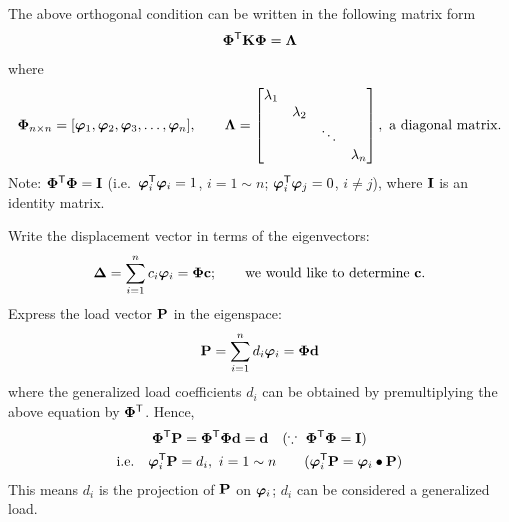 The above orthogonal condition can be written in the following matrix form
\begin{equation}
  \bm{\Phi}^{\mathsf{T}}\mathbf{K}\bm{\Phi} = \bm{\Lambda}
\end{equation}
where
\begin{equation}
  \bm{\Phi}_{n\times n} = [\bm{\varphi}_1,\bm{\varphi}_2,\bm{\varphi}_3,\dots,\bm{\varphi}_n],\qquad
  \bm{\Lambda} = \begin{bmatrix}\lambda_1 & & & \\ & \lambda_2 & & \\ & & \ddots & \\ & & & \lambda_n\end{bmatrix},\ \text{a diagonal matrix}.
\end{equation}
Note: $\bm{\Phi}^{\mathsf{T}}\bm{\Phi} = \mathbf{I}$ (i.e.\ $\bm{\varphi}_i^{\mathsf{T}}\bm{\varphi}_i = 1$, $i = 1\sim n$; $\bm{\varphi}_i^{\mathsf{T}}\bm{\varphi}_j = 0$, $i\neq j$), where $\mathbf{I}$ is an identity matrix.

Write the displacement vector in terms of the eigenvectors:
\begin{equation}
  \bm{\Delta} = \sum_{i=1}^{n}c_i\bm{\varphi}_i = \bm{\Phi}\mathbf{c};\qquad\text{we would like to determine }\mathbf{c}.
\end{equation}
Express the load vector $\mathbf{P}$ in the eigenspace:
\begin{equation}
  \mathbf{P} = \sum_{i=1}^{n}d_i\bm{\varphi}_i = \bm{\Phi}\mathbf{d}
\end{equation}
where the generalized load coefficients $d_i$ can be obtained by premultiplying the above equation by $\bm{\Phi}^{\mathsf{T}}$. Hence,
\begin{gather}
  \bm{\Phi}^{\mathsf{T}}\mathbf{P} = \bm{\Phi}^{\mathsf{T}}\bm{\Phi}\mathbf{d} = \mathbf{d}\quad(\because\ \bm{\Phi}^{\mathsf{T}}\bm{\Phi} = \mathbf{I})\\
  \text{i.e.}\quad \bm{\varphi}_i^{\mathsf{T}}\mathbf{P} = d_i,\ i = 1\sim n\qquad(\bm{\varphi}_i^{\mathsf{T}}\mathbf{P} = \bm{\varphi}_i\bullet\mathbf{P})
\end{gather}
This means $d_i$ is the projection of $\mathbf{P}$ on $\bm{\varphi}_i$; $d_i$ can be considered a generalized load.

